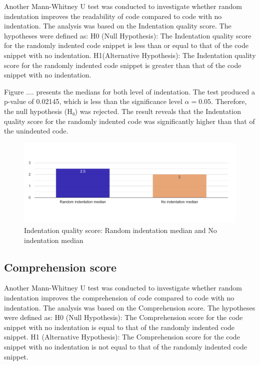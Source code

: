 Another Mann-Whitney U test was conducted to investigate whether random indentation improves the readability of code compared to code with no indentation. The analysis was based on the Indentation quality score. The hypotheses were defined as:  H0 (Null Hypothesis): The Indentation quality score for the randomly indented code snippet is less than or equal to that of the code snippet with no indentation.  H1(Alternative Hypothesis): The Indentation quality score for the randomly indented code snippet is greater than that of the code snippet with no indentation.

Figure .... presents the medians for both level of indentation. 
The test produced a p-value of  0.02145, which is less than the significance level \(\alpha = 0.05\). Therefore, the null hypothesis (H₀) was rejected. The result reveals that the Indentation quality score for the randomly indented code was significantly higher than that of the unindented code.

\begin{figure} [H]
  \centering
  \includegraphics[scale=0.4]{figures/r-0-q5.png}
  \caption{Indentation quality score: Random indentation median and No indentation median}
  \label{fig:AnhangsChor}
\end{figure}


\subsection{Comprehension score}
Another Mann-Whitney U test was conducted to investigate whether random indentation improves the comprehension  of code compared to code with no indentation. The analysis was based on the Comprehension score. The hypotheses were defined as: H0 (Null Hypothesis): The Comprehension score for the code snippet with no indentation is equal to that of the randomly indented code snippet. H1 (Alternative Hypothesis): The Comprehension score for the code snippet with no indentation is not equal to that of the randomly indented code snippet.

